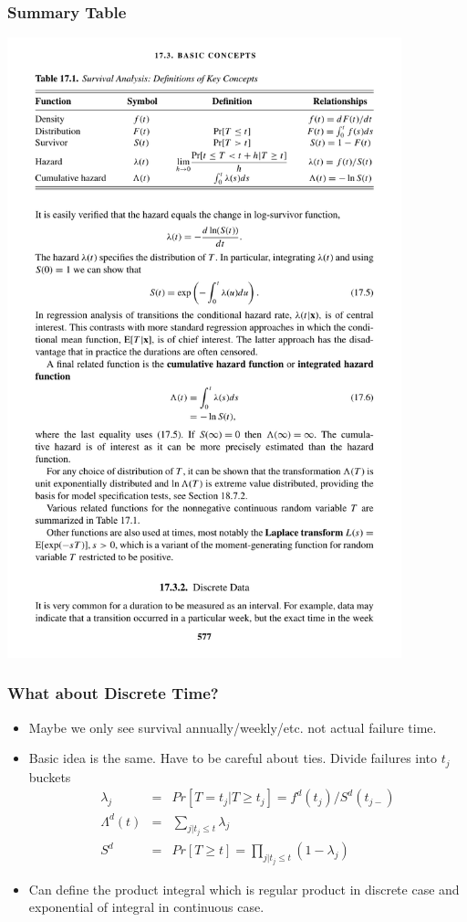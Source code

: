 \documentclass[xcolor=pdftex,dvipsnames,table,mathserif]{beamer}
\begin{document}
\begin{frame}
\frametitle{Summary Table}
\begin{center}
\includegraphics[width=4.5in]{./resources/parametrictable1.pdf}
\end{center}
\end{frame}

\begin{frame}
\frametitle{What about Discrete Time?}
\begin{itemize}
\item Maybe we only see survival annually/weekly/etc. not actual failure time.
\item Basic idea is the same. Have to be careful about ties. Divide failures into $t_j$ buckets
\begin{eqnarray*}
\lambda_j &=& Pr[T = t_j | T \geq t_j] = f^d(t_j) / S^d(t_{j-})\\
\Lambda^d(t)&=&\sum_{j | t_j \leq t} \lambda_j \\
S^d &=& Pr [T \geq t ] = \prod_{j| t_j \leq t} (1-\lambda_j)
\end{eqnarray*}
\item Can define the \alert{product integral} which is regular product in discrete case and exponential of integral in continuous case.
\end{itemize}
\end{frame}
\end{document}
